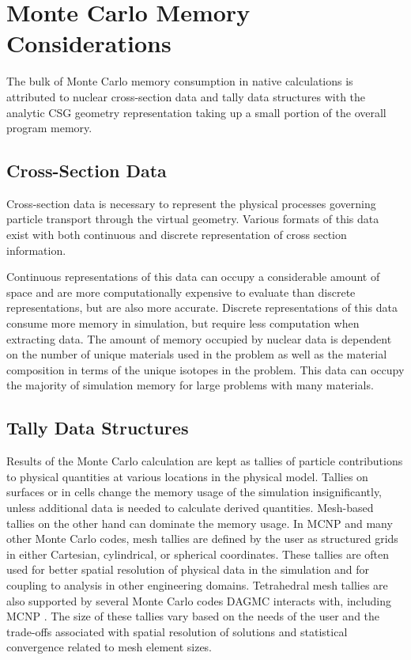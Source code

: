 \section{Monte Carlo Memory Considerations}\label{sec:mc_mem}

The bulk of Monte Carlo memory consumption in native calculations is attributed
to nuclear cross-section data and tally data structures with the analytic CSG
geometry representation taking up a small portion of the overall program memory.

\subsection{Cross-Section Data}

Cross-section data is necessary to represent the physical
processes governing particle transport through the virtual geometry. Various
formats of this data exist with both continuous and discrete representation of
cross section information.

Continuous representations of this data can occupy a considerable amount of
space and are more computationally expensive to evaluate than discrete
representations, but are also more accurate. Discrete representations of this
data consume more memory in simulation, but require less computation when
extracting data. The amount of memory occupied by nuclear data is dependent on
the number of unique materials used in the problem as well as the material
composition in terms of the unique isotopes in the problem. This data can occupy
the majority of simulation memory for large problems with many materials.

\subsection{Tally Data Structures}

Results of the Monte Carlo calculation are kept as tallies of particle
contributions to physical quantities at various locations in the physical
model. Tallies on surfaces or in cells change the memory usage of the simulation
insignificantly, unless additional data is needed to calculate derived
quantities. Mesh-based tallies on the other hand can dominate the memory
usage. In MCNP and many other Monte Carlo codes, mesh tallies are defined by the
user as structured grids in either Cartesian, cylindrical, or spherical
coordinates. These tallies are often used for better spatial resolution of
physical data in the simulation and for coupling to analysis in other
engineering domains. Tetrahedral mesh tallies are also supported by several
Monte Carlo codes DAGMC interacts with, including MCNP
\cite{LANL_MCNP5_VOLIII}. The size of these tallies vary based on the needs of
the user and the trade-offs associated with spatial resolution of solutions and
statistical convergence related to mesh element sizes.

